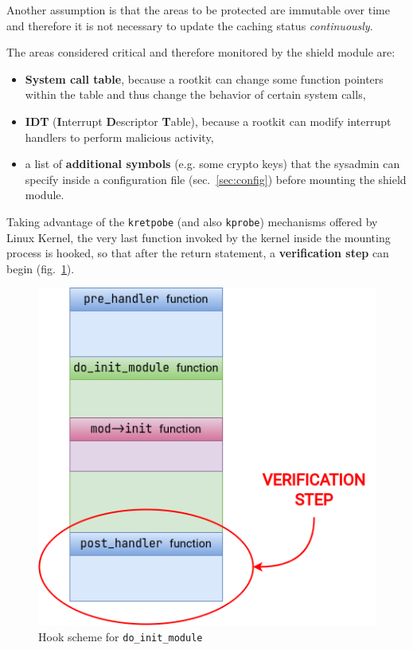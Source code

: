 \documentclass{article}
\begin{document}
	Another assumption is that the areas to be protected are immutable over time and therefore it is not necessary to
	update the caching status \textit{continuously}.

	The areas considered critical and therefore monitored by the shield module are:
	\begin{itemize}
		\item \textbf{System call table}, because a rootkit can change some function pointers within the table and thus
		change the behavior of certain system calls,
		\item \textbf{IDT} (\textbf{I}nterrupt \textbf{D}escriptor \textbf{T}able), because a rootkit can modify
		interrupt handlers to perform malicious activity,
		\item a list of \textbf{additional symbols} (e.g. some crypto keys) that the sysadmin can specify inside a
		configuration file (sec.~\ref{sec:config}) before mounting the shield module.
	\end{itemize}

	Taking advantage of the \texttt{kretpobe} (and also \texttt{kprobe}) mechanisms offered by Linux
	Kernel, the very last function invoked by the kernel inside the mounting process is hooked, so
	that after the return statement, a \textbf{verification step} can begin (fig.~\ref{fig:monitoring}).

	\begin{figure}[!htbp]
		\centering
		\includegraphics[scale=0.4]{monitoring}
		\caption{Hook scheme for \texttt{do\_init\_module}}
		\label{fig:monitoring}
	\end{figure}
\end{document}
